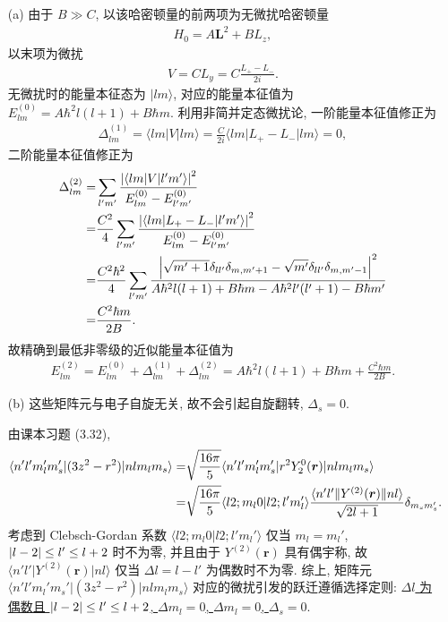 \documentclass{assignment}
\begin{document}
\begin{sol}
    \begin{itemize}
        \item[(a)] 由于 $B\gg C$, 以该哈密顿量的前两项为无微扰哈密顿量
        \begin{align}
            H_0=A\bm{L}^2+BL_z,
        \end{align}
        以末项为微扰
        \begin{align}
            V=CL_y=C\frac{L_+-L_-}{2i}.
        \end{align}
        无微扰时的能量本征态为 $\lvert lm\rangle$, 对应的能量本征值为 $E_{lm}^{(0)}=A\hbar^2l(l+1)+B\hbar m$.
        利用非简并定态微扰论, 一阶能量本征值修正为
        \begin{align}
            \Delta_{lm}^{(1)}=\langle lm\rvert V\lvert lm\rangle=\frac{C}{2i}\langle lm\rvert L_+-L_-\lvert lm\rangle=0,
        \end{align}
        二阶能量本征值修正为
        \begin{align}
            \notag\Delta_{lm}^{(2)}=&\sum_{l'm'}\frac{\left\lvert\langle lm\rvert V\lvert l'm'\rangle\right\rvert^2}{E_{lm}^{(0)}-E_{l'm'}^{(0)}}\\
            \notag=&\frac{C^2}{4}\sum_{l'm'}\frac{\left\lvert\langle lm\rvert L_+-L_-\lvert l'm'\rangle\right\rvert^2}{E_{lm}^{(0)}-E_{l'm'}^{(0)}}\\
            \notag=&\frac{C^2\hbar^2}{4}\sum_{l'm'}\frac{\left\lvert\sqrt{m'+1}\delta_{ll'}\delta_{m,m'+1}-\sqrt{m'}\delta_{ll'}\delta_{m,m'-1}\right\rvert^2}{A\hbar^2l(l+1)+B\hbar m-A\hbar^2l'(l'+1)-B\hbar m'}\\
            \notag=&\frac{C^2\hbar m}{2B}.
        \end{align}
        故精确到最低非零级的近似能量本征值为
        \begin{align}
            E_{lm}^{(2)}=E_{lm}^{(0)}+\Delta_{lm}^{(1)}+\Delta_{lm}^{(2)}=A\hbar^2l(l+1)+B\hbar m+\frac{C^2\hbar m}{2B}.
        \end{align}
        \item[(b)] 这些矩阵元与电子自旋无关, 故不会引起自旋翻转, $\Delta_s=0$.

        由课本习题 (3.32),
        \begin{align}
            \notag\langle n'l'm_l'm_s'\rvert(3z^2-r^2)\lvert nlm_lm_s\rangle=&\sqrt{\frac{16\pi}{5}}\langle n'l'm_l'm_s'\rvert r^2Y_2^0(\bm{r})\lvert nlm_lm_s\rangle\\
            =&\sqrt{\frac{16\pi}{5}}\langle l2;m_l0\vert l2;l'm_l'\rangle\frac{\langle n'l'\rVert Y^{(2)}(\bm{r})\lVert nl\rangle}{\sqrt{2l+1}}\delta_{m_sm_s'}.
        \end{align}
        考虑到 Clebsch-Gordan 系数 $\langle l2;m_l0\vert l2;l'm_l'\rangle$ 仅当 $m_l=m_l'$, $\left\lvert l-2\right\rvert\leq l'\leq l+2$ 时不为零, 并且由于 $Y^{(2)}(\bm{r})$ 具有偶宇称, 故 $\langle n'l'\rvert Y^{(2)}(\bm{r})\lvert nl\rangle$ 仅当 $\Delta l=l-l'$ 为偶数时不为零.
        综上, 矩阵元 $\langle n'l'm_l'm_s'\rvert(3z^2-r^2)\lvert nlm_lm_s\rangle$ 对应的微扰引发的跃迁遵循选择定则: \uline{$\Delta l$ 为偶数且 $\left\lvert l-2\right\rvert\leq l'\leq l+2$, $\Delta m_l=0$, $\Delta m_l=0$, $\Delta_s=0$}.


\end{itemize}
\end{sol}
\end{document}
